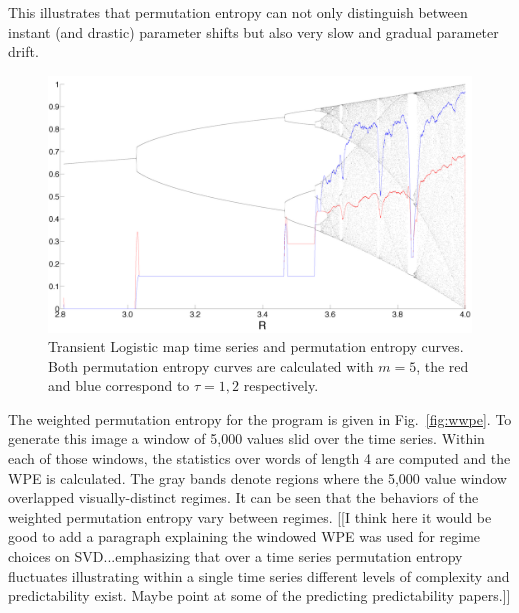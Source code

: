  This illustrates that permutation entropy can not only distinguish between instant (and drastic) parameter shifts but also very slow and gradual parameter drift.

\begin{figure}[ht]
  \centering
  \includegraphics[width=\columnwidth]{unused-figs/tstranslog-perm}
  \caption{Transient Logistic map time series and permutation entropy curves. Both permutation entropy curves are calculated with $m=5$, the red and blue correspond to $\tau = 1,2$ respectively.}
  \label{fig:translogistic}
\end{figure}



The weighted permutation entropy for the \svd program is given in
Fig.~\ref{fig:wwpe}. To generate this image a window of 5,000 values slid over
the time series. Within each of those windows, the statistics over words of
length 4 are computed and the WPE is calculated. The gray bands denote regions
where the 5,000 value window overlapped visually-distinct regimes. It can be
seen that the behaviors of the weighted permutation entropy vary between
regimes. [[I think here it would be good to add a paragraph explaining the windowed WPE was used for regime choices on SVD...emphasizing  that over a time series permutation entropy fluctuates illustrating within a single time series different levels of complexity and predictability exist. Maybe point at some of the predicting predictability papers.]]



